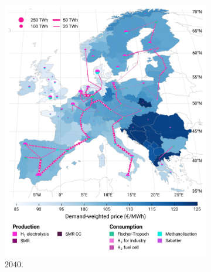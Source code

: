 \documentclass[final,5p,times,twocolumn,sort&compress]{elsarticle}
\begin{document}
\begin{figure}[htbp]
\begin{subfigure}[t]{0.4\textwidth}
      \includegraphics[width=1\textwidth,trim=0cm 2.8cm 0cm 0cm, clip]{maps/pcipmi/base_s_adm___2040-balance_map_H2}
      \vspace{-0.5cm}
      \caption{ 2040.}
      \label{fig:PCI_lt_2040_h2}
  \end{subfigure}
  \hfill
  \begin{subfigure}[t]{0.4\textwidth}
      \vspace{0pt}

\end{subfigure}
\end{figure}
\end{document}
